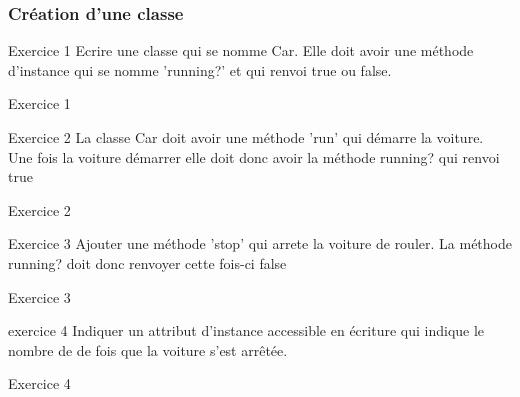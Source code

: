 \documentclass{beamer}
\begin{document}
\begin{frame}
  \frametitle{Cr\'eation d'une classe}
  \begin{block}{Exercice 1}
  Ecrire une classe qui se nomme Car. Elle doit avoir une m\'ethode d'instance qui
  se nomme 'running?' et qui renvoi true ou false.
\end{block}
\end{frame}

\begin{frame}
  \begin{block}{Exercice 1}
    
  \end{block}
\end{frame}

\begin{frame}
  \begin{block}{Exercice 2}
  La classe Car doit avoir une m\'ethode 'run' qui d\'emarre la voiture.
  Une fois la voiture d\'emarrer elle doit donc avoir la m\'ethode running? qui
  renvoi true
\end{block}
\end{frame}
\begin{frame}
  \begin{beamerboxesrounded}{Exercice 2}
    
  \end{beamerboxesrounded}
\end{frame}

\begin{frame}
  \begin{block}{Exercice 3}
  Ajouter une m\'ethode 'stop' qui arrete la voiture de rouler. La m\'ethode running?
  doit donc renvoyer cette fois-ci false
\end{block}
\end{frame}
\begin{frame}
  \begin{beamerboxesrounded}{Exercice 3}
    
  \end{beamerboxesrounded}
\end{frame}

\begin{frame}
  \begin{block}{exercice 4}
  Indiquer un attribut d'instance accessible en \'ecriture qui indique le nombre de
  de fois que la voiture s'est arrêt\'ee.
\end{block}
\end{frame}
\begin{frame}
  \begin{beamerboxesrounded}{Exercice 4}
    
  \end{beamerboxesrounded}
\end{frame}
\end{document}
